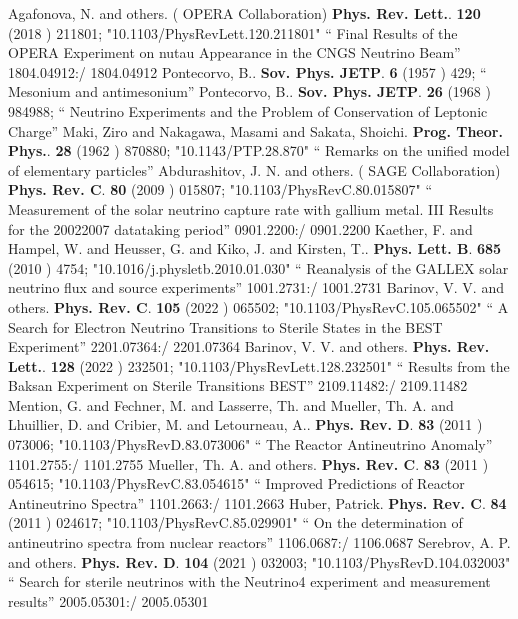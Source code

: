 \documentclass{article}
\begin{document}
\begin{thebibliography}{99}
  Agafonova, N. and others. ( OPERA Collaboration) {\bf  Phys. Rev. Lett.}. {\bf  120} (2018 )  211801;  "10.1103/PhysRevLett.120.211801" `` Final Results of the OPERA Experiment on nutau Appearance in the CNGS Neutrino Beam'' 1804.04912:/ 1804.04912
  Pontecorvo, B.. {\bf  Sov. Phys. JETP}. {\bf  6} (1957 )  429; `` Mesonium and antimesonium''
  Pontecorvo, B.. {\bf  Sov. Phys. JETP}. {\bf  26} (1968 )  984988; `` Neutrino Experiments and the Problem of Conservation of Leptonic Charge''
  Maki, Ziro and Nakagawa, Masami and Sakata, Shoichi. {\bf  Prog. Theor. Phys.}. {\bf  28} (1962 )  870880;  "10.1143/PTP.28.870" `` Remarks on the unified model of elementary particles''
  Abdurashitov, J. N. and others. ( SAGE Collaboration) {\bf  Phys. Rev. C}. {\bf  80} (2009 )  015807;  "10.1103/PhysRevC.80.015807" `` Measurement of the solar neutrino capture rate with gallium metal. III Results for the 20022007 datataking period'' 0901.2200:/ 0901.2200
  Kaether, F. and Hampel, W. and Heusser, G. and Kiko, J. and Kirsten, T.. {\bf  Phys. Lett. B}. {\bf  685} (2010 )  4754;  "10.1016/j.physletb.2010.01.030" `` Reanalysis of the GALLEX solar neutrino flux and source experiments'' 1001.2731:/ 1001.2731
  Barinov, V. V. and others. {\bf  Phys. Rev. C}. {\bf  105} (2022 )  065502;  "10.1103/PhysRevC.105.065502" `` A Search for Electron Neutrino Transitions to Sterile States in the BEST Experiment'' 2201.07364:/ 2201.07364
  Barinov, V. V. and others. {\bf  Phys. Rev. Lett.}. {\bf  128} (2022 )  232501;  "10.1103/PhysRevLett.128.232501" `` Results from the Baksan Experiment on Sterile Transitions BEST'' 2109.11482:/ 2109.11482
  Mention, G. and Fechner, M. and Lasserre, Th. and Mueller, Th. A. and Lhuillier, D. and Cribier, M. and Letourneau, A.. {\bf  Phys. Rev. D}. {\bf  83} (2011 )  073006;  "10.1103/PhysRevD.83.073006" `` The Reactor Antineutrino Anomaly'' 1101.2755:/ 1101.2755
  Mueller, Th. A. and others. {\bf  Phys. Rev. C}. {\bf  83} (2011 )  054615;  "10.1103/PhysRevC.83.054615" `` Improved Predictions of Reactor Antineutrino Spectra'' 1101.2663:/ 1101.2663
  Huber, Patrick. {\bf  Phys. Rev. C}. {\bf  84} (2011 )  024617;  "10.1103/PhysRevC.85.029901" `` On the determination of antineutrino spectra from nuclear reactors'' 1106.0687:/ 1106.0687
  Serebrov, A. P. and others. {\bf  Phys. Rev. D}. {\bf  104} (2021 )  032003;  "10.1103/PhysRevD.104.032003" `` Search for sterile neutrinos with the Neutrino4 experiment and measurement results'' 2005.05301:/ 2005.05301

\end{thebibliography}
\end{document}
